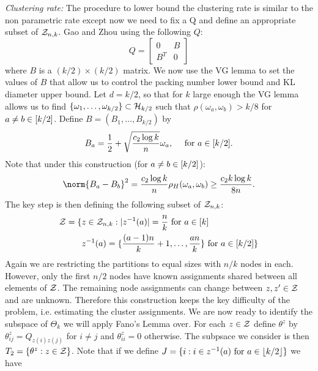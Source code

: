 \documentclass[11pt]{article}
\begin{document}
\textit{Clustering rate:} The procedure to lower bound the clustering rate is similar to the non parametric rate except now we need to fix a Q and define an appropriate subset of $\mathcal{Z}_{n,k}$. Gao and Zhou using the following $Q$:
\begin{equation}
Q = \left[
\begin{array}{cc}
0 & B \\
B^T & 0
\end{array}
\right]
\end{equation}
where $B$ is a $(k/2) \times (k/2)$ matrix. We now use the VG lemma to set the values of $B$ that allow us to control the packing number lower bound and KL diameter upper bound. Let $d = k/2$, so that for $k$ large enough the VG lemma allows us to find $\{\omega_1, \dots, \omega_{k/2}\} \subset \mathcal{H}_{k/2}$ such that $\rho(\omega_a, \omega_b) > k/8$ for $a \neq b \in \lbrack k/2\rbrack$. Define $B = (B_1, \dots, B_{k/2})$ by
\begin{equation}
B_a = \frac{1}{2} + \sqrt{\frac{c_2 \log k}{n}}\omega_a, \quad \text{ for } a \in \lbrack k/2\rbrack.
\end{equation}
Note that under this construction (for $a \neq b \in \lbrack k/2\rbrack$):
\begin{equation}
\norm{B_a - B_b}^2 = \frac{c_2 \log k}{n} \rho_H(\omega_a, \omega_b) \geq \frac{c_2 k \log k}{8 n}.
\end{equation}
The key step is then defining the following subset of $\mathcal{Z}_{n,k}$:
\begin{equation}
\begin{aligned}
\mathcal{Z} = \{&z \in \mathcal{Z}_{n,k} : |z^{-1}(a)| = \frac{n}{k} \text{ for } a \in \lbrack k\rbrack \\
          &z^{-1}(a) = \{\frac{(a-1)n}{k} + 1, \dots, \frac{an}{k}\} \text{ for } a \in \lbrack k/2\rbrack\}
\end{aligned}
\end{equation}
Again we are restricting the partitions to equal sizes with $n/k$ nodes in each. However, only the first $n/2$ nodes have known assignments shared between all elements of $\mathcal{Z}$. The remaining node assignments can change between $z, z' \in \mathcal{Z}$ and are unknown. Therefore this construction keeps the key difficulty of the problem, i.e. estimating the cluster assignments. We are now ready to identify the subspace of $\Theta_k$ we will apply Fano's Lemma over. For each $z \in \mathcal{Z}$ define $\theta^{z}$ by $\theta_{ij}^z = Q_{z(i)z(j)}$ for $i \neq j$ and $\theta_{ii}^z = 0$ otherwise. The subpsace we consider is then $T_2 = \{\theta^{z} : z \in \mathcal{Z}\}$. Note that if we define $J = \{i : i \in z^{-1}(a) \text{ for } a \in \lfloor k/2\rfloor\}$ we have
\end{document}
